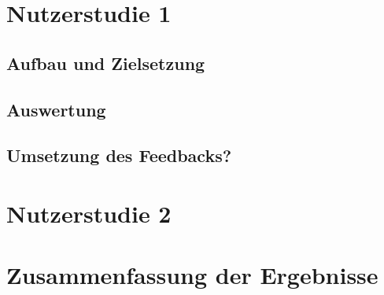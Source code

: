 \section{Nutzerstudie 1}\label{sec:Nutzerstudie1}

\subsection{Aufbau und Zielsetzung}\label{sec:AufbauNutzerstudie1}

\subsection{Auswertung}\label{sec:AuswertungNutzerStudie1}

\subsection{Umsetzung des Feedbacks?}\label{sec:UmsetzungFeedbackNutzerstudie1}

\section{Nutzerstudie 2}\label{sec:Nutzerstudie2}

\section{Zusammenfassung der Ergebnisse}\label{sec:ZusammenfassungNutzerstudien}

